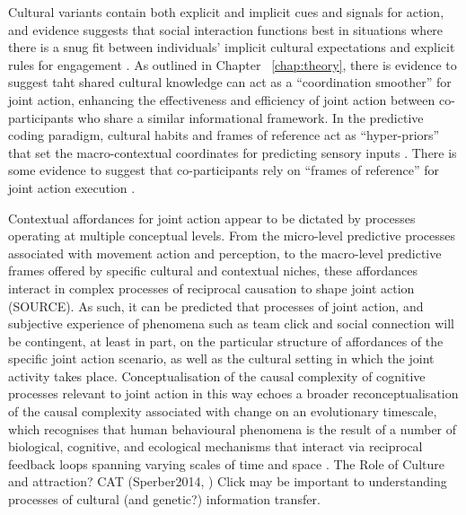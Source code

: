 \begin{CJK}{UTF8}{gbsn}
  Cultural variants contain both explicit and implicit cues and signals for action, and evidence suggests that social interaction functions best in situations where there is a snug fit between individuals' implicit cultural expectations and explicit rules for engagement \citep{Vollan2017}.  As outlined in Chapter ~\ref{chap:theory}, there is evidence to suggest taht shared cultural knowledge can act as a ``coordination smoother'' \citep{Vesper2017} for joint action, enhancing the effectiveness and efficiency of joint action between co-participants who share a similar informational framework.  In the predictive coding paradigm, cultural habits and frames of reference act as ``hyper-priors'' that set the macro-contextual coordinates for predicting sensory inputs \citep{Clark2013}.   There is some evidence to suggest that co-participants rely on ``frames of reference'' for joint action execution \citep{Ray2018}.

  Contextual affordances for joint action appear to be dictated by processes operating at multiple conceptual levels.  From the micro-level predictive processes associated with movement action and perception, to the macro-level predictive frames offered by specific cultural and contextual niches, these affordances interact in complex processes of reciprocal causation to shape joint action (SOURCE).  As such, it can be predicted that processes of joint action, and subjective experience of phenomena such as team click and social connection will be contingent, at least in part, on the particular structure of affordances of the specific joint action scenario, as well as the cultural setting in which the joint activity takes place.  Conceptualisation of the causal complexity of cognitive processes relevant to joint action in this way echoes a broader reconceptualisation of the causal complexity associated with change on an evolutionary timescale, which recognises that human behavioural phenomena is the result of a number of biological, cognitive, and ecological mechanisms that interact via reciprocal feedback loops spanning varying scales of time and space \citep{Fuentes2015}.
  The Role of Culture and attraction? CAT (Sperber2014, )
  Click may be important to understanding processes of cultural (and genetic?) information transfer.




\end{CJK}

